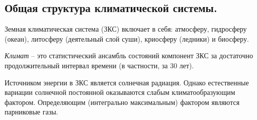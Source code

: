 \subsection{Общая структура климатической системы.}
Земная климатическая система (ЗКС) включает в себя: атмосферу, гидросферу (океан), литосферу (деятельный слой суши), криосферу (ледники) и биосферу.

\textit{Климат} -- это статистический ансамбль состояний компонент ЗКС за достаточно продолжительный интервал времени (в частности, за 30 лет).

Источником энергии в ЗКС является солнечная радиация.
Однако естественные вариации солнечной постоянной оказываются слабым климатообразующим фактором.
Определяющим (интегрально максимальным) фактором являются парниковые газы.
